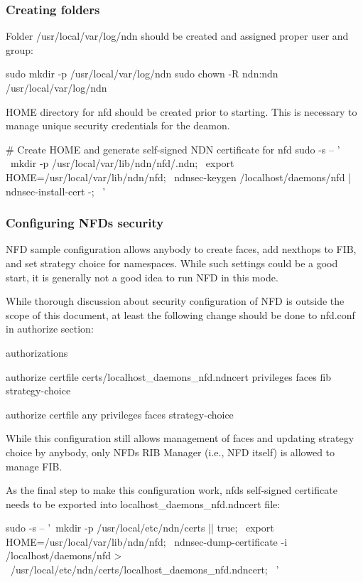 \subsubsection*{Creating folders}

Folder {\ttfamily /usr/local/var/log/ndn} should be created and assigned proper user and group\+: \begin{DoxyVerb}sudo mkdir -p /usr/local/var/log/ndn
sudo chown -R ndn:ndn /usr/local/var/log/ndn
\end{DoxyVerb}


{\ttfamily H\+O\+ME} directory for {\ttfamily nfd} should be created prior to starting. This is necessary to manage unique security credentials for the deamon. \begin{DoxyVerb}# Create HOME and generate self-signed NDN certificate for nfd
sudo -s -- ' \
  mkdir -p /usr/local/var/lib/ndn/nfd/.ndn; \
  export HOME=/usr/local/var/lib/ndn/nfd; \
  ndnsec-keygen /localhost/daemons/nfd | ndnsec-install-cert -; \
'
\end{DoxyVerb}


\subsubsection*{Configuring N\+FD\textquotesingle{}s security}

N\+FD sample configuration allows anybody to create faces, add nexthops to F\+IB, and set strategy choice for namespaces. While such settings could be a good start, it is generally not a good idea to run N\+FD in this mode.

While thorough discussion about security configuration of N\+FD is outside the scope of this document, at least the following change should be done to {\ttfamily nfd.\+conf} in authorize section\+: \begin{DoxyVerb}authorizations
{
  authorize
  {
    certfile certs/localhost_daemons_nfd.ndncert
    privileges
    {
        faces
        fib
        strategy-choice
    }
  }

  authorize
  {
    certfile any
    privileges
    {
        faces
        strategy-choice
    }
  }
}
\end{DoxyVerb}


While this configuration still allows management of faces and updating strategy choice by anybody, only N\+FD\textquotesingle{}s R\+IB Manager (i.\+e., N\+FD itself) is allowed to manage F\+IB.

As the final step to make this configuration work, nfd\textquotesingle{}s self-\/signed certificate needs to be exported into {\ttfamily localhost\+\_\+daemons\+\_\+nfd.\+ndncert} file\+: \begin{DoxyVerb}sudo -s -- '\
  mkdir -p /usr/local/etc/ndn/certs || true; \
  export HOME=/usr/local/var/lib/ndn/nfd; \
  ndnsec-dump-certificate -i /localhost/daemons/nfd > \
    /usr/local/etc/ndn/certs/localhost_daemons_nfd.ndncert; \
  '
\end{DoxyVerb}


